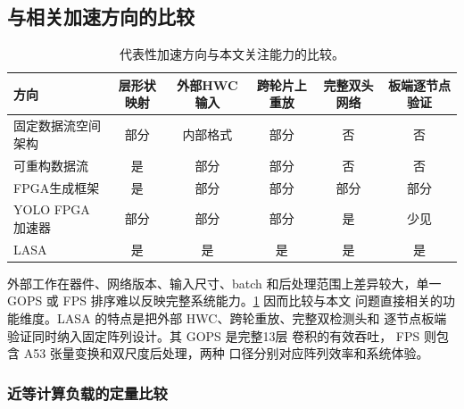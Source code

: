 \subsection{与相关加速方向的比较}

\begin{table}[t]
\centering
\caption{代表性加速方向与本文关注能力的比较。}
\label{tab:academic-related}
\small
\begin{tabular}{lccccc}
\toprule
方向 & 层形状映射 & 外部HWC输入 & 跨轮片上重放 & 完整双头网络 & 板端逐节点验证 \\
\midrule
固定数据流空间架构\cite{chen2016eyeriss,jouppi2017tpu} & 部分 & 内部格式 & 部分 & 否 & 否 \\
可重构数据流\cite{maeri2018,simba2019} & 是 & 部分 & 部分 & 否 & 否 \\
FPGA生成框架\cite{finn2017,fpgaConvNet2015,dnnBuilder2018} & 是 & 部分 & 部分 & 部分 & 部分 \\
YOLO FPGA加速器\cite{yolov2fpga2018,tinyyoloaccel2022,multicoreyolo2023} & 部分 & 部分 & 部分 & 是 & 少见 \\
LASA & 是 & 是 & 是 & 是 & 是 \\
\bottomrule
\end{tabular}
\end{table}

外部工作在器件、网络版本、输入尺寸、batch 和后处理范围上差异较大，单一 GOPS
或 FPS 排序难以反映完整系统能力。\cref{tab:academic-related} 因而比较与本文
问题直接相关的功能维度。LASA 的特点是把外部 HWC、跨轮重放、完整双检测头和
逐节点板端验证同时纳入固定阵列设计。其 \PLEffectiveGOPS{} GOPS 是完整13层
卷积的有效吞吐，\ResidentFPS{} FPS 则包含 A53 张量变换和双尺度后处理，两种
口径分别对应阵列效率和系统体验。

\subsubsection{近等计算负载的定量比较}

